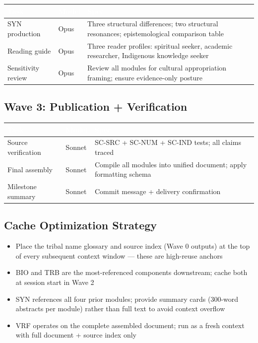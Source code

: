 \documentclass[11pt,letterpaper]{article}
\newcommand{\tableheader}[1]{\textbf{\sffamily\textcolor{white}{#1}}}
\begin{document}
\begin{center}
\begin{tabularx}{\textwidth}{L{2.5cm}L{2cm}X}
\toprule
{}
\tableheader{Task} & \tableheader{Model} & \tableheader{Spec} \\
\midrule
SYN production & Opus & Three structural differences; two structural resonances; epistemological comparison table \\
Reading guide & Opus & Three reader profiles: spiritual seeker, academic researcher, Indigenous knowledge seeker \\
Sensitivity review & Opus & Review all modules for cultural appropriation framing; ensure evidence-only posture \\
\bottomrule
\end{tabularx}
\end{center}

\subsection{Wave 3: Publication + Verification}

\begin{center}
\begin{tabularx}{\textwidth}{L{2.5cm}L{2cm}X}
\toprule
{}
\tableheader{Task} & \tableheader{Model} & \tableheader{Spec} \\
\midrule
Source verification & Sonnet & SC-SRC + SC-NUM + SC-IND tests; all claims traced \\
Final assembly & Sonnet & Compile all modules into unified document; apply formatting schema \\
Milestone summary & Sonnet & Commit message + delivery confirmation \\
\bottomrule
\end{tabularx}
\end{center}

\subsection{Cache Optimization Strategy}

\begin{itemize}[noitemsep]
  \item Place the tribal name glossary and source index (Wave 0 outputs) at the top of every subsequent context window --- these are high-reuse anchors
  \item BIO and TRB are the most-referenced components downstream; cache both at session start in Wave 2
  \item SYN references all four prior modules; provide summary cards (300-word abstracts per module) rather than full text to avoid context overflow
  \item VRF operates on the complete assembled document; run as a fresh context with full document + source index only
\end{itemize}
\end{document}
